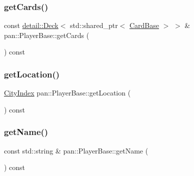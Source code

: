 \mbox{\label{classpan_1_1_player_base_a8c23e4d5910f85c0e942f3b0819743af}} 
\subsubsection{\texorpdfstring{get\+Cards()}{getCards()}\hspace{0.1cm}{\footnotesize\ttfamily [2/2]}}
{\footnotesize\ttfamily const \hyperlink{classpan_1_1detail_1_1_deck}{detail\+::\+Deck}$<$ std\+::shared\+\_\+ptr$<$ \hyperlink{classpan_1_1_card_base}{Card\+Base} $>$ $>$ \& pan\+::\+Player\+Base\+::get\+Cards (\begin{DoxyParamCaption}{ }\end{DoxyParamCaption}) const\hspace{0.3cm}{\ttfamily [inline]}}

\mbox{\label{classpan_1_1_player_base_aa4bc65b9e86fa2b506f5191be751cfea}} 
\subsubsection{\texorpdfstring{get\+Location()}{getLocation()}}
{\footnotesize\ttfamily \hyperlink{namespacepan_afaed28aa6603153dcc062a028602d697}{City\+Index} pan\+::\+Player\+Base\+::get\+Location (\begin{DoxyParamCaption}{ }\end{DoxyParamCaption}) const\hspace{0.3cm}{\ttfamily [inline]}}

\mbox{\label{classpan_1_1_player_base_a427d73fde6596033fbe0ebd511d1e7c1}} 
\subsubsection{\texorpdfstring{get\+Name()}{getName()}}
{\footnotesize\ttfamily const std\+::string \& pan\+::\+Player\+Base\+::get\+Name (\begin{DoxyParamCaption}{ }\end{DoxyParamCaption}) const\hspace{0.3cm}{\ttfamily [inline]}}

